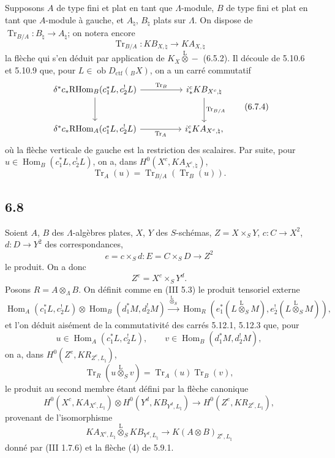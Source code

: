\documentclass[11pt]{article}
\DeclareMathOperator{\Hom}{Hom}
\providecommand{\RHom}{\mathrm{RHom}}
\providecommand{\Tr}{\operatorname{Tr}}
\providecommand{\Tr}{\operatorname{Tr}}
\providecommand{\lten}{\overset{\mathrm L}{\otimes}}
\providecommand{\Ob}{\operatorname{ob}}
\providecommand{\Tr}{\operatorname{Tr}}
\providecommand{\RHom}{\mathrm{RHom}}
\providecommand{\Hom}{\operatorname{Hom}}
\providecommand{\lten}{\overset{\mathrm L}{\otimes}}
\providecommand{\RHom}{\mathrm R\mathcal{H}om}
\providecommand{\lten}{\overset{\mathrm L}{\otimes}}
\providecommand{\Ob}{\operatorname{ob}}
\providecommand{\Tr}{\operatorname{Tr}}
\providecommand{\lten}{\overset{\mathrm L}{\otimes}}
\providecommand{\lten}{\overset{\mathrm L}{\otimes}}
\providecommand{\Ob}{\operatorname{Ob}}
\providecommand{\lten}{\overset{\mathrm L}{\otimes}}
\begin{document}
Supposons $A$ de type fini et plat en tant que $\Lambda$-module, $B$ de type fini et plat en tant que $A$-module à gauche, et $A_{\natural}$, $B_{\natural}$ plats sur $\Lambda$. On dispose de $\Tr_{B/A}:B_{\natural}\to A_{\natural}$; on notera encore
\begin{equation}
\Tr_{B/A}:KB_{X,\natural}\longrightarrow KA_{X,\natural}
\tag{6.7.3}
\end{equation}
la flèche qui s'en déduit par application de $K_X\lten -$ (6.5.2). Il découle de 5.10.6 et 5.10.9 que, pour $L\in\Ob D_{\mathrm{ctf}}({}_BX)$, on a un carré commutatif
\begin{equation}
\begin{tikzcd}[column sep=huge,row sep=large]
\delta^*c_*\RHom_B(c_1^*L,c_2^!L) \arrow[r,"\Tr_B"] \arrow[d]
& i_*^cKB_{X^c,\natural} \arrow[d,"\Tr_{B/A}"]\\
\delta^*c_*\RHom_A(c_1^*L,c_2^!L) \arrow[r,"\Tr_A"']
& i_*^cKA_{X^c,\natural},
\end{tikzcd}
\tag{6.7.4}
\end{equation}
où la flèche verticale de gauche est la restriction des scalaires. Par suite, pour $u\in\Hom_B(c_1^*L,c_2^!L)$, on a, dans $H^0(X^c,KA_{X^c,\natural})$,
\begin{equation}
\Tr_A(u)=\Tr_{B/A}(\Tr_B(u)).
\tag{6.7.5}
\end{equation}

\subsection*{6.8}
Soient $A$, $B$ des $\Lambda$-algèbres plates, $X$, $Y$ des $S$-schémas, $Z=X\times_SY$, $c:C\to X^2$, $d:D\to Y^2$ des correspondances,
\[
e=c\times_Sd:E=C\times_SD\longrightarrow Z^2
\]
le produit. On a donc
\[
Z^e=X^c\times_SY^d.
\]
Posons $R=A\otimes_{\Lambda}B$. On définit comme en (III 5.3) le produit tensoriel externe
\begin{equation}
\Hom_A(c_1^*L,c_2^!L)\otimes \Hom_B(d_1^*M,d_2^!M)
\xrightarrow{\ \lten_S\ }
\Hom_R(e_1^*(L\lten_SM),e_2^!(L\lten_SM)),
\tag{6.8.1}
\end{equation}
et l'on déduit aisément de la commutativité des carrés 5.12.1, 5.12.3 que, pour
\[
u\in\Hom_A(c_1^*L,c_2^!L),\qquad v\in\Hom_B(d_1^*M,d_2^!M),
\]
on a, dans $H^0(Z^e,KR_{Z^e,L_{\natural}})$,
\begin{equation}
\Tr_R(u\lten_Sv)=\Tr_A(u)\Tr_B(v),
\tag{6.8.2}
\end{equation}
le produit au second membre étant défini par la flèche canonique
\begin{equation}
H^0(X^c,KA_{X^c,L_{\natural}})\otimes
H^0(Y^d,KB_{Y^d,L_{\natural}})
\longrightarrow
H^0(Z^e,KR_{Z^e,L_{\natural}}),
\tag{6.8.3}
\end{equation}
provenant de l'isomorphisme
\[
KA_{X^c,L_{\natural}}\lten_S KB_{Y^d,L_{\natural}}\longrightarrow K(A\otimes B)_{Z^e,L_{\natural}}
\]
donné par (III 1.7.6) et la flèche (4) de 5.9.1.
\end{document}

